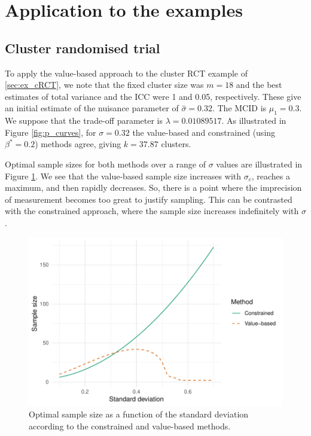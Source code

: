 \documentclass[sagev, Crown]{sagej}
\begin{document}
\section{Application to the examples}\label{sec:illustration}

\subsection{Cluster randomised trial}

To apply the value-based approach to the cluster RCT example of \ref{sec:ex_cRCT}, we note that the fixed cluster size was $m = 18$ and the best estimates of total variance and the ICC were 1 and 0.05, respectively. These give an initial estimate of the nuisance parameter of $\hat{\sigma} = 0.32$. The MCID is $\mu_1 = 0.3$. We suppose that the trade-off parameter is $\lambda = 0.01089517$. As illustrated in Figure \ref{fig:p_curves}, for  $\sigma = 0.32$ the value-based and constrained (using $\beta^* = 0.2$) methods agree, giving $ k = 37.87$ clusters.

Optimal sample sizes for both methods over a range of $\sigma$ values are illustrated in Figure \ref{fig:opt_t_test}. We see that the value-based sample size increases with $\sigma_c$, reaches a maximum, and then rapidly decreases. So, there is a point where the imprecision of measurement becomes too great to justify sampling. This can be contrasted with the constrained approach, where the sample size increases indefinitely with $\sigma$.

\begin{figure}
\centering
\includegraphics[scale=0.8]{./figures/opt_t_test}
\caption{Optimal sample size as a function of the standard deviation according to the constrained and value-based methods.}
\label{fig:opt_t_test}
\end{figure}
\end{document}
